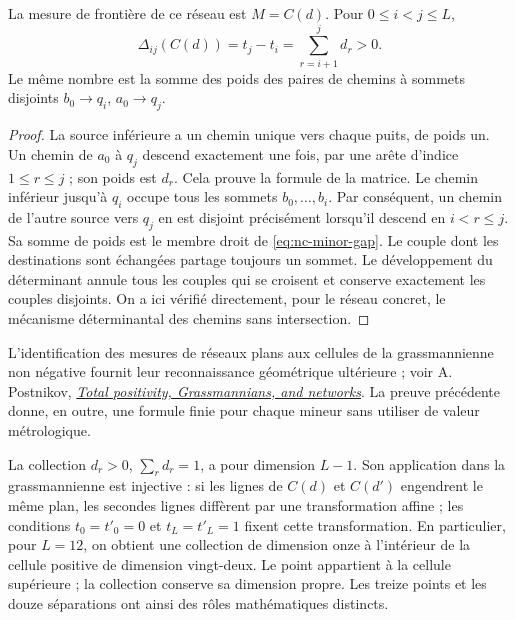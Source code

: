 \begin{theorem}
\label{thm:nc-network}
La mesure de frontière de ce réseau est \(M=C(d)\). Pour
\(0\le i<j\le L\),
\begin{equation}
 \Delta_{ij}(C(d))=t_j-t_i=\sum_{r=i+1}^{j}d_r>0.
 \label{eq:nc-minor-gap}
\end{equation}
Le même nombre est la somme des poids des paires de chemins
à sommets disjoints \(b_0\to q_i\), \(a_0\to q_j\).
\end{theorem}
\begin{proof}
La source inférieure a un chemin unique vers chaque puits, de poids un.
Un chemin de \(a_0\) à \(q_j\) descend exactement une fois, par une
arête d’indice \(1\le r\le j\) ; son poids est \(d_r\). Cela prouve la
formule de la matrice. Le chemin inférieur jusqu’à \(q_i\) occupe tous les
sommets \(b_0,\ldots,b_i\). Par conséquent, un chemin de l’autre source vers
\(q_j\) en est disjoint précisément lorsqu’il descend en
\(i<r\le j\). Sa somme de poids est le membre droit de
\eqref{eq:nc-minor-gap}. Le couple dont les destinations sont échangées
partage toujours un sommet. Le développement du déterminant annule tous les
couples qui se croisent et conserve exactement les couples disjoints. On a ici
vérifié directement, pour le réseau concret, le mécanisme déterminantal
des chemins sans intersection.
\end{proof}

L’identification des mesures de réseaux plans aux cellules de la
grassmannienne non négative fournit leur reconnaissance géométrique ultérieure ;
voir A. Postnikov,
\href{https://arxiv.org/abs/math/0609764}{\emph{Total positivity,
Grassmannians, and networks}}. La preuve précédente donne, en outre, une formule
finie pour chaque mineur sans utiliser de valeur métrologique.

La collection \(d_r>0\), \(\sum_rd_r=1\), a pour dimension \(L-1\). Son application dans la grassmannienne est injective : si les lignes de \(C(d)\) et \(C(d')\) engendrent le même plan, les secondes lignes diffèrent par une transformation affine ; les conditions \(t_0=t'_0=0\) et \(t_L=t'_L=1\) fixent cette transformation. En particulier, pour \(L=12\), on obtient une collection de dimension onze à l'intérieur de la cellule positive de dimension vingt-deux. Le point appartient à la cellule supérieure ; la collection conserve sa dimension propre. Les treize points et les douze séparations ont ainsi des rôles mathématiques distincts.

